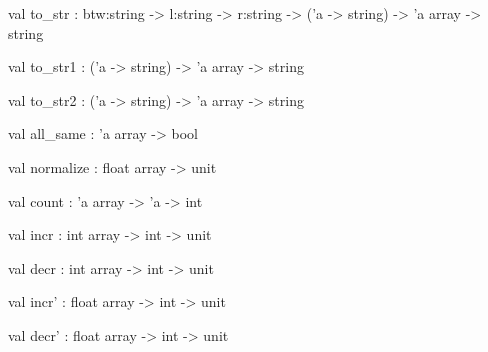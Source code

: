 \documentclass[11pt]{article}
\begin{document}
\begin{ocamldocsigend}
\label{val:Util.A.to-underscorestr}\begin{ocamldoccode}
val to_str :
  btw:string -> l:string -> r:string -> ('a -> string) -> 'a array -> string
\end{ocamldoccode}


\label{val:Util.A.to-underscorestr1}\begin{ocamldoccode}
val to_str1 : ('a -> string) -> 'a array -> string
\end{ocamldoccode}


\label{val:Util.A.to-underscorestr2}\begin{ocamldoccode}
val to_str2 : ('a -> string) -> 'a array -> string
\end{ocamldoccode}


\label{val:Util.A.all-underscoresame}\begin{ocamldoccode}
val all_same : 'a array -> bool
\end{ocamldoccode}


\label{val:Util.A.normalize}\begin{ocamldoccode}
val normalize : float array -> unit
\end{ocamldoccode}


\label{val:Util.A.count}\begin{ocamldoccode}
val count : 'a array -> 'a -> int
\end{ocamldoccode}


\label{val:Util.A.incr}\begin{ocamldoccode}
val incr : int array -> int -> unit
\end{ocamldoccode}


\label{val:Util.A.decr}\begin{ocamldoccode}
val decr : int array -> int -> unit
\end{ocamldoccode}


\label{val:Util.A.incr'}\begin{ocamldoccode}
val incr' : float array -> int -> unit
\end{ocamldoccode}


\label{val:Util.A.decr'}\begin{ocamldoccode}
val decr' : float array -> int -> unit
\end{ocamldoccode}



\end{ocamldocsigend}
\end{document}

